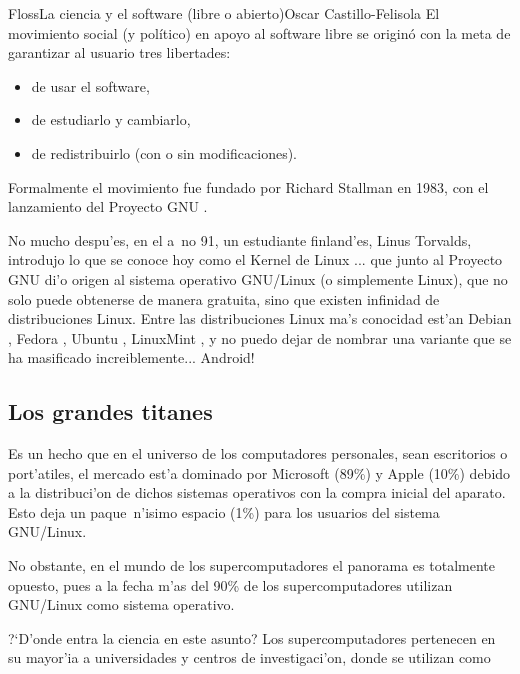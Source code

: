 \begin{article}[2]{Floss}{La ciencia y el software (libre o abierto)}{Oscar Castillo-Felisola}
El movimiento social (y pol\'itico)  en apoyo al software libre se origin\'o con la meta de garantizar al usuario tres libertades:
\begin{itemize}%
\item de usar el software,
\item de estudiarlo y cambiarlo,
\item de redistribuirlo (con o sin modificaciones).
\end{itemize}%
Formalmente el movimiento fue fundado por Richard Stallman en 1983, con el lanzamiento del Proyecto GNU .

No mucho despu'es, en el  a~no 91, un estudiante finland'es, Linus Torvalds, introdujo lo que se conoce hoy como el Kernel de Linux ... que junto al Proyecto GNU di'o origen al sistema operativo GNU/Linux (o simplemente Linux), que no solo puede obtenerse de manera gratuita, sino que existen infinidad de distribuciones Linux. Entre las distribuciones Linux ma's conocidad est'an Debian , Fedora , Ubuntu , LinuxMint , y no puedo dejar de nombrar una variante que se ha masificado increiblemente... Android! 

\subsection{Los grandes titanes}


Es un hecho que en el universo de los computadores personales, sean escritorios o port'atiles, el mercado est'a dominado por Microsoft (89\%) y Apple (10\%) debido a la distribuci'on de dichos sistemas operativos con la compra inicial del aparato. Esto deja un paque~n'isimo espacio (1\%) para los usuarios del sistema GNU/Linux.

No obstante, en el mundo de los supercomputadores el panorama es totalmente opuesto, pues a la fecha m'as del 90\% de los supercomputadores utilizan GNU/Linux como sistema operativo.

?`D'onde entra la ciencia en este asunto? Los supercomputadores pertenecen en su mayor'ia a universidades y centros de investigaci'on, donde se utilizan como 


\end{article}
